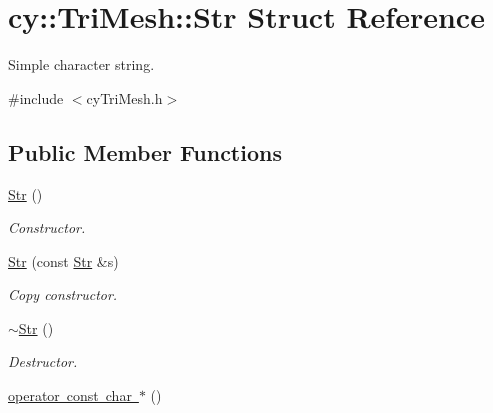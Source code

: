 \hypertarget{structcy_1_1_tri_mesh_1_1_str}{}\section{cy\+::Tri\+Mesh\+::Str Struct Reference}
\label{structcy_1_1_tri_mesh_1_1_str}


Simple character string.  




{\ttfamily \#include $<$cy\+Tri\+Mesh.\+h$>$}

\subsection*{Public Member Functions}
\begin{DoxyCompactItemize}
\item 
\mbox{\label{structcy_1_1_tri_mesh_1_1_str_ab12f04b3ada77769318d6382c1a72186}} 
\mbox{\hyperlink{structcy_1_1_tri_mesh_1_1_str_ab12f04b3ada77769318d6382c1a72186}{Str}} ()
\begin{DoxyCompactList}\small\item\em Constructor. \end{DoxyCompactList}\item 
\mbox{\label{structcy_1_1_tri_mesh_1_1_str_ac74b6f5ea50a3afe7a83c1e0dd81a715}} 
\mbox{\hyperlink{structcy_1_1_tri_mesh_1_1_str_ac74b6f5ea50a3afe7a83c1e0dd81a715}{Str}} (const \mbox{\hyperlink{structcy_1_1_tri_mesh_1_1_str}{Str}} \&s)
\begin{DoxyCompactList}\small\item\em Copy constructor. \end{DoxyCompactList}\item 
\mbox{\label{structcy_1_1_tri_mesh_1_1_str_ae8499fc202dbc444399cf5d62c2ef932}} 
\mbox{\hyperlink{structcy_1_1_tri_mesh_1_1_str_ae8499fc202dbc444399cf5d62c2ef932}{$\sim$\+Str}} ()
\begin{DoxyCompactList}\small\item\em Destructor. \end{DoxyCompactList}\item 
\mbox{\label{structcy_1_1_tri_mesh_1_1_str_ad65b36c6506c55cf3c95d650e26802e5}} 
\mbox{\hyperlink{structcy_1_1_tri_mesh_1_1_str_ad65b36c6506c55cf3c95d650e26802e5}{operator const char $\ast$}} ()

\end{DoxyCompactItemize}
